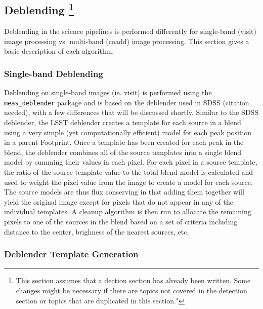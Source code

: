 \subsection{Deblending \footnote{This section assumes that a dection section has already been written. Some changes might be necessary if there are topics not covered in the detection section or topics that are duplicated in this section."}}

\label{sec:deblending}

Deblending in the science pipelines is performed differently for single-band (visit) image processing vs. multi-band (coadd) image processing.
This section gives a basic description of each algorithm.

\subsubsection{Single-band Deblending}

\label{sec:singleband_deblending}

Deblending on single-band images (ie. visit) is performed using the \texttt{meas\_deblender} package and is based on the deblender used in SDSS (citation needed), with a few differences that will be discussed shortly.
Similar to the SDSS deblender, the LSST deblender creates a template for each source in a blend using a very simple (yet computationally efficient) model for each peak position in a parent Footprint.
Once a template has been created for each peak in the blend, the deblender combines all of the source templates into a single blend model by summing their values in each pixel.
For each pixel in a source template, the ratio of the source template value to the total blend model is calculated and used to weight the pixel value from the image to create a model for each source.
The source models are thus flux conserving in that adding them together will yield the original image except for pixels that do not appear in any of the individual templates.
A cleanup algorithm is then run to allocate the remaining pixels to one of the sources in the blend based on a set of criteria including distance to the center, brighness of the nearest sources, etc.

\subsubsection{Deblender Template Generation}

